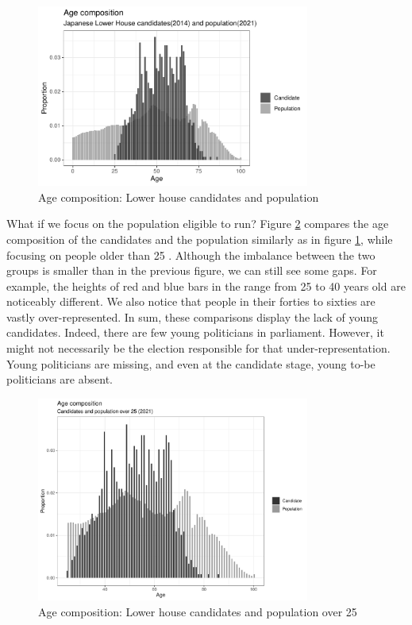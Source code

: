 \documentclass[a4paper, 12pt]{article}\usepackage[dvipdfmx]{graphicx}\usepackage[]{xcolor}
\begin{document}
\begin{figure}
\centering
  \includegraphics[width=0.8\textwidth]{figure/comp_age/comp_all.pdf}
  \caption{Age composition: Lower house candidates and population}
  \label{allAge}
\end{figure}

What if we focus on the population eligible to run? Figure \ref{o25} compares the age composition of the candidates and the population similarly as in figure \ref{allAge}, while focusing on people older than 25 \footnotemark{}. Although the imbalance between the two groups is smaller than in the previous figure, we can still see some gaps. For example, the heights of red and blue bars in the range from 25 to 40 years old are noticeably different. We also notice that people in their forties to sixties are vastly over-represented. In sum, these comparisons display the lack of young candidates. Indeed, there are few young politicians in parliament. However, it might not necessarily be the election responsible for that under-representation. Young politicians are missing, and even at the candidate stage, young to-be politicians are absent.

\begin{figure}
\centering
  \includegraphics[width=0.8\textwidth]{figure/comp_age/comp_o25.pdf}
  \caption{Age composition: Lower house candidates and population over 25}
  \label{o25}
\end{figure}
\end{document}
